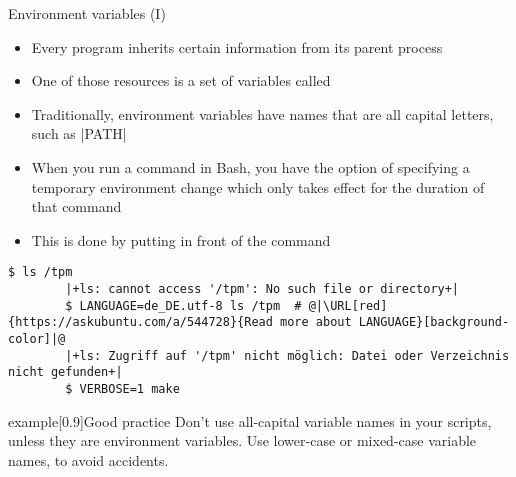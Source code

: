 \begin{frame}[fragile]{Environment variables (I)}
    \vspace{-3mm}
    \begin{itemize}
        \item Every program inherits certain information from its parent process 
        \item One of those resources is a set of variables called 
        \item Traditionally, environment variables have names that are all capital letters, such as \bash|PATH|
        \item When you run a command in Bash, you have the option of specifying a temporary environment change which only takes effect for the duration of that command
        \item This is done by putting  in front of the command
    \end{itemize}
    \begin{lstlisting}[style=MyBash]
        $ ls /tpm
        |+ls: cannot access '/tpm': No such file or directory+|
        $ LANGUAGE=de_DE.utf-8 ls /tpm  # @|\URL[red]{https://askubuntu.com/a/544728}{Read more about LANGUAGE}[background-color]|@
        |+ls: Zugriff auf '/tpm' nicht möglich: Datei oder Verzeichnis nicht gefunden+|
        $ VERBOSE=1 make
    \end{lstlisting}
    \begin{varblock}{example}[0.9\textwidth]{Good practice}
        Don't use all-capital variable names in your scripts, unless they are environment variables.
        Use lower-case or mixed-case variable names, to avoid accidents.
    \end{varblock}
\end{frame}
